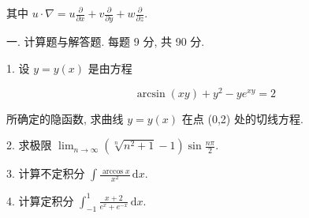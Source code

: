 \documentclass{examcollection}
\renewcommand{\displayformula}[1]{\[#1\]}
\begin{document}
{\begin{minipage}{\textwidth}
其中  $u \cdot \nabla = u \frac{\partial}{\partial x} + v \frac{\partial}{\partial y} + w \frac{\partial}{\partial z}.$\par
{}\smallskip
一. 计算题与解答题. 每题 9 分, 共 90 分.\par
1. 设 $y = y(x)$ 是由方程\par
\displayformula{\arcsin (x y) + y ^ {2} - y e ^ {x y} = 2}\par
所确定的隐函数, 求曲线 $y = y(x)$ 在点 (0,2) 处的切线方程.\par
2. 求极限 $\lim_{n\to \infty}\left(\sqrt[n]{n^2 + 1} -1\right)\sin \frac{n\pi}{2}$.\par
3. 计算不定积分 $\int \frac{\arccos x}{x^2} \, \mathrm{d}x$.\par
4. 计算定积分 $\int_{-1}^{1} \frac{x + 2}{e^x + e^{-x}} \, \mathrm{d}x$.\par
\end{minipage}}
\ifdim\dimexpr\ht\proofbox+\dp\proofbox\relax>\textheight
\noindent\resizebox{!}{\textheight}{\usebox{\proofbox}}\else\noindent\usebox{\proofbox}\fi\clearpage
\end{document}
